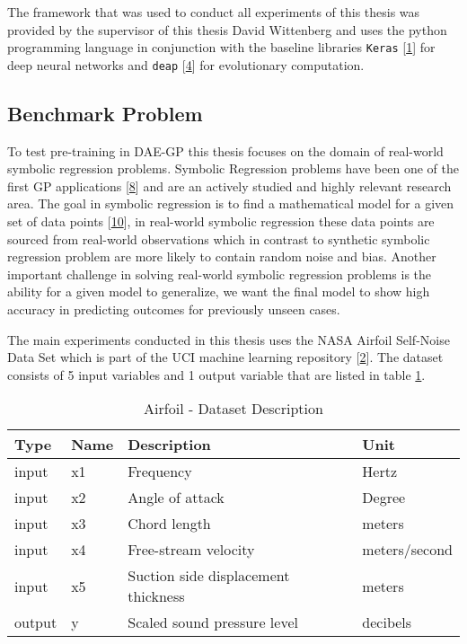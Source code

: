 \documentclass[
  11pt,
]{article}
\begin{document}
The framework that was used to conduct all experiments of this thesis was provided by the supervisor of this thesis David Wittenberg and uses the python programming language in conjunction with the baseline libraries \texttt{Keras} {[}\protect\hyperlink{ref-chollet2015keras}{1}{]} for deep neural networks and \texttt{deap} {[}\protect\hyperlink{ref-DEAP_JMLR2012}{4}{]} for evolutionary computation.

\hypertarget{benchmark-problem}{%
\subsection{Benchmark Problem}\label{benchmark-problem}}

To test pre-training in DAE-GP this thesis focuses on the domain of real-world symbolic regression problems. Symbolic Regression problems have been one of the first GP applications {[}\protect\hyperlink{ref-Koza1993GeneticP}{8}{]} and are an actively studied and highly relevant research area. The goal in symbolic regression is to find a mathematical model for a given set of data points {[}\protect\hyperlink{ref-10.1007ux2f978-3-540-24621-3_22}{10}{]}, in real-world symbolic regression these data points are sourced from real-world observations which in contrast to synthetic symbolic regression problem are more likely to contain random noise and bias. Another important challenge in solving real-world symbolic regression problems is the ability for a given model to generalize, we want the final model to show high accuracy in predicting outcomes for previously unseen cases.

The main experiments conducted in this thesis uses the NASA Airfoil Self-Noise Data Set which is part of the UCI machine learning repository {[}\protect\hyperlink{ref-machine_learning_repo}{2}{]}. The dataset consists of 5 input variables and 1 output variable that are listed in table \ref{tab:airfoil-dataset-description}.

\begin{table}[!h]

\caption{\label{tab:airfoil-dataset-description}Airfoil - Dataset Description}
\centering
\begin{tabular}[t]{l|l|l|l}
\hline
\textbf{Type} & \textbf{Name} & \textbf{Description} & \textbf{Unit}\\
\hline
input & x1 & Frequency & Hertz\\
\hline
input & x2 & Angle of attack & Degree\\
\hline
input & x3 & Chord length & meters\\
\hline
input & x4 & Free-stream velocity & meters/second\\
\hline
input & x5 & Suction side displacement thickness & meters\\
\hline
output & y & Scaled sound pressure level & decibels\\
\hline
\end{tabular}
\end{table}
\end{document}
